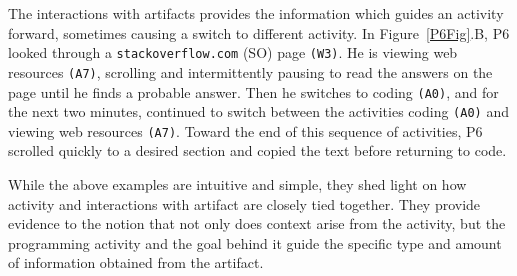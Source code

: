 The interactions with artifacts provides the information which guides an activity forward, sometimes causing a switch to different activity. In Figure~\ref{P6Fig}.B, P6 looked through a \texttt{stackoverflow.com} (SO) page \texttt{(W3)}. He is viewing web resources \texttt{(A7)}, scrolling and intermittently pausing to read the answers on the page until he finds a probable answer. Then he switches to coding \texttt{(A0)}, and for the next two minutes, continued to switch between the activities coding \texttt{(A0)} and viewing web resources \texttt{(A7)}. Toward the end of this sequence of activities, P6 scrolled quickly to a desired section and copied the text before returning to code.


While the above examples are intuitive and simple, they shed light on how activity and interactions with artifact are closely tied together. They provide evidence to the notion that not only does context arise from the activity, but the programming activity and the goal behind it guide the specific type and amount of information obtained from the artifact. 








